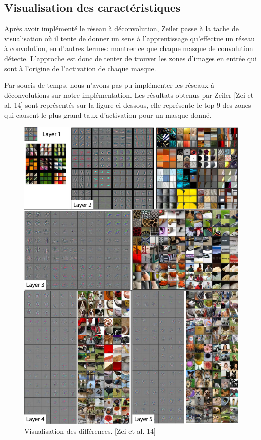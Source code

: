 \subsection{Visualisation des caractéristiques}

	Après avoir implémenté le réseau à déconvolution, Zeiler passe à la tache de visualisation où il tente de donner un sens à l'apprentissage qu'effectue un réseau à convolution, en d'autres termes: montrer ce que chaque masque de convolution détecte. L'approche est donc de tenter de trouver les zones d'images en entrée qui sont à l'origine de l'activation de chaque masque. 
	
	Par soucis de temps, nous n'avons pas pu implémenter les réseaux à déconvolutions sur notre implémentation. Les résultats obtenus par Zeiler [Zei et al. 14] sont représentés sur la figure ci-dessous, elle représente le top-9 des zones qui causent le plus grand taux d'activation pour un masque donné.
 
\begin{figure}[H]
	\centering
		\includegraphics[width=5in]{Figures/visualisation.png}
	\caption[Res]{Visualisation des différences. [Zei et al. 14]}
	\label{fig:Electron}
\end{figure}


